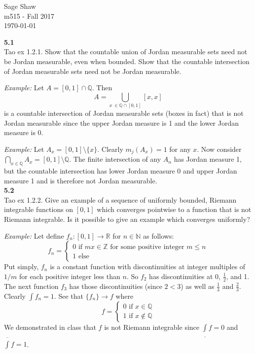 \documentclass[12pt]{article}
\newcommand{\problem}[1]{\hspace{-4 ex} \large \textbf{#1}\\}
\begin{document}
	\thispagestyle{empty}
	
	\begin{flushright}
		Sage Shaw \\
		m515 - Fall 2017 \\
		\today
	\end{flushright}
	

\problem{5.1} Tao ex 1.2.1. Show that the countable union of Jordan measurable sets need not be Jordan measurable, even when bounded. Show that the countable intersection of Jordan measurable sets need not be Jordan measurable.

	\textit{Example:} Let $A = [0,1] \cap \mathbb{Q}$. Then $$A = \bigcup\limits_{x\ \in \mathbb{Q} \cap [0,1]}[x,x]$$ is a countable intersection of Jordan measurable sets (boxes in fact) that is not Jordan measurable since the upper Jordan measure is 1 and the lower Jordan measure is 0. \bigbreak

	\textit{Example:} Let $A_x = [0,1]\setminus\{x\}$. Clearly $m_j(A_x)=1$ for any $x$. Now consider $\bigcap\limits_{x \in \mathbb{Q}}A_x = [0,1] \setminus \mathbb{Q}$. The finite intersection of any $A_n$ has Jordan measure 1, but the countable intersection has lower Jordan measure 0 and upper Jordan measure 1 and is therefore not Jordan measurable.\\
	
	
\problem{5.2} Tao ex 1.2.2. Give an example of a sequence of uniformly bounded, Riemann integrable functions on $[0,1]$ which converges pointwise to a function that is not Riemann integrable. Is it possible to give an example which converges uniformly?

	\textit{Example:} Let define $f_n:[0,1] \to \mathbb{R}$ for $n \in \mathbb{N}$ as follows: 
	\[
		f_n = 
			\begin{cases}
				0 \text{ if } mx \in \mathbb{Z} \text{ for some positive integer }m \leq n\\
				1 \text{ else }
			\end{cases}
	\]
	Put simply, $f_n$ is a constant function with discontinuities at integer multiples of $1/m$ for each positive integer less than $n$. So $f_2$ has discontinuities at 0, $\frac{1}{2}$, and 1. The next function $f_3$ has those discontinuities (since $2<3$) as well as $\frac{1}{3}$ and  $\frac{2}{3}$. Clearly $\int f_n = 1$. See that $\{f_n\} \to f$ where
	\[
		f = 
			\begin{cases}
				0 \text{ if } x \in \mathbb{Q} \\
				1 \text{ if } x \notin \mathbb{Q}
			\end{cases}
	\]
	We demonstrated in class that $f$ is not Riemann integrable since $\underline{\int} f = 0$ and $\overline {\int} f = 1$. \bigbreak
	
\end{document}
